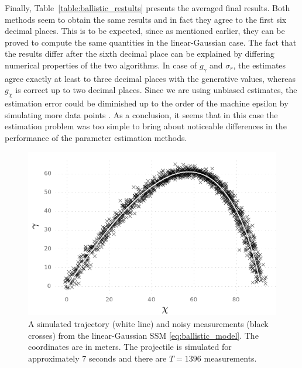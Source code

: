 Finally, Table~\ref{table:ballistic_restults} presents the averaged final
results. Both methods seem to obtain the same results and in fact they agree to the first six decimal places. 
This is to be expected, since as mentioned earlier, they can be proved to compute the same quantities 
in the linear-Gaussian case. The fact that
the results differ after the sixth decimal place can be explained by differing
numerical properties of the two algorithms. In case of $g_\gamma$ and $\sigma_r$,
the estimates agree exactly at least to three decimal places with the generative
values, whereas $g_\chi$ is correct up to two decimal places. Since we are using
unbiased estimates, the estimation error could be diminished up to the order of the machine
epsilon by simulating more data points .
As a conclusion, it seems that in this case the estimation problem was too simple to bring
about noticeable differences in the performance of the parameter estimation methods.

\begin{figure}[htbp]%
    \centering%
    \includegraphics{img/ballistic_trajectory}%
	\caption{A simulated trajectory (white line) and noisy
	measurements (black crosses) from 
	the linear-Gaussian SSM \eqref{eq:ballistic_model}. 
   	The coordinates are in meters.
   	The projectile is simulated for approximately $7$
   	seconds and there are $T=1396$ measurements.
   	}\label{fig:ballistic2D_simulation}
 \end{figure}

